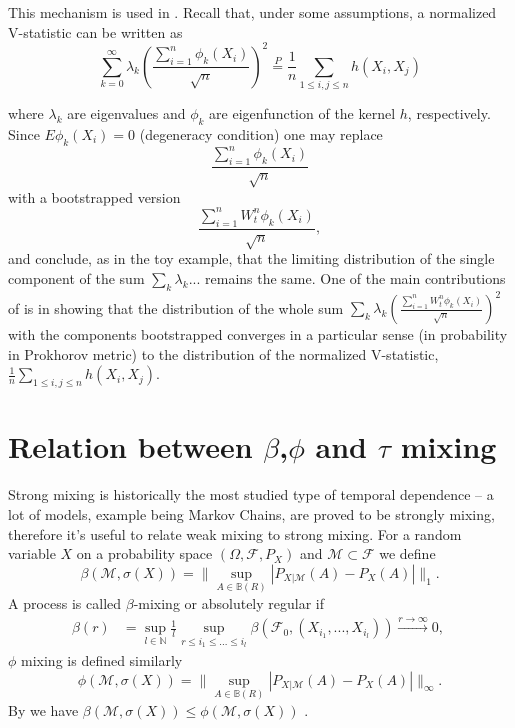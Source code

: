 \documentclass{article} %
\newcommand{\ev}{E}
\begin{document}
This mechanism is used in \cite{leucht_dependent_2013}. Recall that, under some assumptions, a normalized V-statistic can be written as 
$$
\sum_{k=0}^{\infty} \lambda_k  \left( \frac{ \sum_{i=1}^{n} \phi_k(X_i) } {\sqrt n}  \right)^2 \overset{P}{=} \frac 1  n \sum_{1\leq i,j \leq n} h(X_i,X_j) 
$$ 

where $\lambda_k$ are eigenvalues and $\phi_k$ are eigenfunction of the  kernel $h$, respectively.  Since $\ev  \phi_k(X_i) = 0$ (degeneracy condition) one may replace  
$$  \frac{ \sum_{i=1}^{n} \phi_k(X_i)} {\sqrt n} $$
with a bootstrapped version 
$$ \frac{  \sum_{i=1}^{n}  W_t^n \phi_k(X_i) } {\sqrt n}, $$  
and conclude, as in the toy example, that the limiting distribution of the single component of the sum $\sum_k \lambda_k  ...$  remains the same. One of the main  contributions of \cite{leucht_dependent_2013}  is in showing that the distribution of the whole sum $\sum_k \lambda_k \left(\frac{  \sum_{i=1}^{n}  W_t^n \phi_k(X_i) } {\sqrt n} \right)^2$ with the components bootstrapped  
converges in a particular sense (in  probability in Prokhorov metric) to the distribution of the normalized V-statistic, $\frac 1  n \sum_{1\leq i,j \leq n} h(X_i,X_j) $.



\section{Relation between $\beta$,$\phi$ and $\tau$ mixing}
\label{append:differentMixing}

Strong mixing is historically the most studied type of temporal dependence -- a lot of models, example being Markov Chains, are proved to be strongly mixing, therefore it's useful to relate weak mixing  to strong mixing. For a random variable $X$ on a probability space $(\Omega,\mathcal{F},P_X)$ and $\mathcal{M} \subset \mathcal{F}$ we define 
\begin{equation*}
\beta(\mathcal{M},\sigma(X)) = \| \sup_{A \in \mathbb{B}(R)} | P_{X|\mathcal{M}}(A) - P_X(A)|\|_1.
\end{equation*}
A process  is called $\beta$-mixing or absolutely regular if  
\begin{align*}
\beta(r) &= \sup_{l \in \mathbb{N}} \frac 1 l \sup_{ r \leq i_1 \leq ... \leq i_l} \beta( \mathcal F_0,(X_{i_1},...,X_{i_l}) )  \overset{r \to \infty}{\longrightarrow} 0,\
\end{align*}
$\phi$ mixing is defined similarly
\begin{equation*}
\phi(\mathcal{M},\sigma(X)) = \| \sup_{A \in \mathbb{B}(R)} | P_{X|\mathcal{M}}(A) - P_X(A)|\|_\infty.
\end{equation*}
 By \cite{bradley_basic_2005} we have  $\beta(\mathcal{M},\sigma(X)) \leq \phi(\mathcal{M},\sigma(X)) $ . 
 
\end{document}
